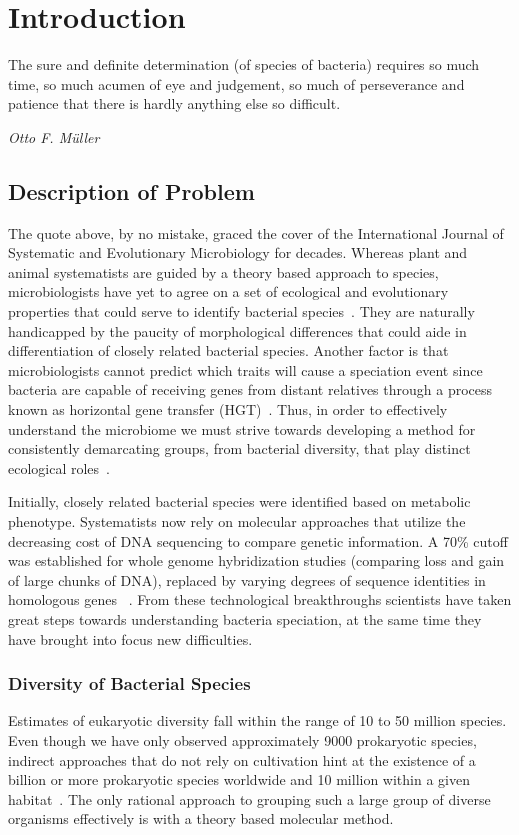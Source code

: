 \chapter{Introduction}
\begin{shadequote}
The sure and definite determination (of species of bacteria) requires so much time, so much %
acumen of eye and judgement, so much of perseverance and patience that there is hardly %
anything else so \mbox{difficult}. \par\emph{Otto F. M\"uller}
\end{shadequote}
\section{Description of Problem}
The quote above, by no mistake, graced the cover of the International Journal of Systematic and Evolutionary %
Microbiology for decades. Whereas plant and animal systematists are guided by a theory based approach %
to  species, microbiologists have yet to agree on a set of ecological and evolutionary %
properties that could serve to identify bacterial species~\cite{cohan2007systematics}. They are naturally %
handicapped by the paucity of morphological differences that could aide in differentiation of closely related %
bacterial species. Another factor is that microbiologists cannot predict which traits will cause a speciation event since %
bacteria are capable of receiving genes from distant relatives through a process known as horizontal gene %
transfer (HGT)~\cite{cohan2007systematics}. Thus, in order to effectively understand the microbiome we must %
strive towards developing a method for consistently demarcating groups, from bacterial diversity, that play %
distinct ecological roles~\cite{koeppel2008identifying}.

Initially, closely related bacterial species were identified based on metabolic phenotype. Systematists now %
rely on molecular approaches that utilize the decreasing cost of DNA sequencing to compare genetic %
information. A 70\% cutoff was established for whole genome hybridization studies (comparing loss and %
gain of large chunks of DNA), replaced by varying degrees of sequence identities in homologous genes%
~\cite{cohan2007systematics,carlo}. From these technological breakthroughs scientists have taken great steps %
towards understanding bacteria speciation, at the same time they have brought into focus new difficulties.

\subsection{Diversity of Bacterial Species}
Estimates of eukaryotic diversity fall within the range of 10 to 50 million species. Even though we have %
only observed approximately 9000 prokaryotic species, indirect approaches that do not rely on cultivation %
hint at the existence of a billion or more prokaryotic species worldwide and 10 million within a given %
habitat~\cite{cohan2008origins}. The only rational approach to grouping such a large group of diverse %
organisms effectively is with a theory based molecular method.

